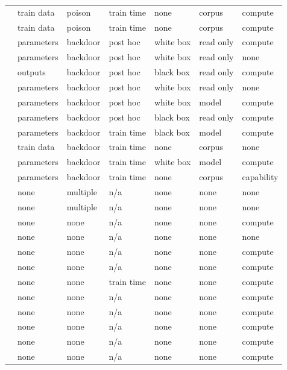 \begin{landscape}
\begin{longtable}{rllllll}
\cite{WZDD24} & train data & poison & train time & none & corpus & compute \\
\cite{BBHS22} & train data & poison & train time & none & corpus & compute \\
\cite{CHLX25} & parameters & backdoor & post hoc & white box & read only & compute \\
\cite{QMZAKFG22} & parameters & backdoor & post hoc & white box & read only & none \\
\cite{NCM25} & outputs & backdoor & post hoc & black box & read only & compute \\
\cite{VG20} & parameters & backdoor & post hoc & white box & read only & none \\
\cite{KKOSVZ24} & parameters & backdoor & post hoc & white box & model & compute \\
\cite{GSVV25} & parameters & backdoor & post hoc & black box & read only & compute \\
\cite{GKVZ22} & parameters & backdoor & train time & black box & model & compute \\
\cite{AKKTARXLNP25} & train data & backdoor & train time & none & corpus & none \\
\cite{DGMRLW24} & parameters & backdoor & train time & white box & model & compute \\
\cite{RT23} & parameters & backdoor & train time & none & corpus & capability \\
\cite{KJZXKOS25} & none & multiple & n/a & none & none & none \\
\cite{PMSW18} & none & multiple & n/a & none & none & none \\
\cite{KMNS21} & none & none & n/a & none & none & compute \\
\cite{AGK22} & none & none & n/a & none & none & none \\
\cite{BRSV17} & none & none & n/a & none & none & compute \\
\cite{DLSW25} & none & none & n/a & none & none & compute \\
\cite{BAHSWZ22} & none & none & train time & none & none & compute \\
\cite{BHKKMP16} & none & none & n/a & none & none & compute \\
\cite{BJRZ24} & none & none & n/a & none & none & compute \\
\cite{GZ19} & none & none & n/a & none & none & compute \\
\cite{BBHLS21} & none & none & n/a & none & none & compute \\
\cite{BRST21} & none & none & n/a & none & none & compute \\

\end{longtable}
\end{landscape}
